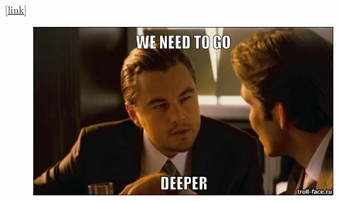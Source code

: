 \documentclass[10pt, compress]{beamer}
\begin{document}
\begin{frame}
  \vspace{1cm}
  [\href{https://medium.com/@sidereal/cnns-architectures-lenet-alexnet-vgg-googlenet-resnet-and-more-666091488df5}{link}]
  \begin{figure}
    \includegraphics[width=.85\linewidth]{imgs/we-need-to-go-deeper}
  \end{figure}
\end{frame}

%
\end{document}
